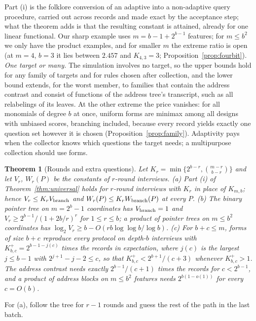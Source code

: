 \documentclass{article}
\newtheorem{theorem}{Theorem}
\begin{document}
Part (i) is the folklore conversion of an adaptive into a non-adaptive query procedure, carried out across records and made exact by the acceptance step; what the theorem adds is that the resulting constant is attained, already for one linear functional. Our sharp example uses $m=b-1+2^{b-1}$ features; for $m\le b^2$ we only have the product examples, and for smaller $m$ the extreme ratio is open (at $m=4$, $b=3$ it lies between $2.457$ and $K_{4,3}=3$; Proposition~\ref{prop:fourbit}). \emph{One target or many.} The simulation involves no target, so the upper bounds hold for any family of targets and for rules chosen after collection, and the lower bound extends, for the worst member, to families that contain the address contrast and consist of functions of the address tree's transcript, such as all relabelings of its leaves. At the other extreme the price vanishes: for all monomials of degree $b$ at once, uniform forms are minimax among all designs with unbiased scores, branching included, because every record yields exactly one question set however it is chosen (Proposition~\ref{prop:family}). Adaptivity pays when the collector knows which questions the target needs; a multipurpose collection should use forms.

\begin{theorem}[Rounds and extra questions]\label{thm:rounds}
Let $K_r=\min\{2^{b-r},\binom{m-r}{b-r}\}$ and let $V_r$, $W_r(P)$ be the constants of $r$-round interviews.
\textup{(a)} Part \textup{(i)} of Theorem~\ref{thm:universal} holds for $r$-round interviews with $K_r$ in place of $K_{m,b}$; hence $V_r\le K_rV_{\rm branch}$ and $W_r(P)\le K_rW_{\rm branch}(P)$ at every $P$.
\textup{(b)} The binary pointer tree on $m=2^b-1$ coordinates has $V_{\rm branch}=1$ and $V_r\ge2^{b-1}/(1+2b/r)^{r}$ for $1\le r\le b$; a product of pointer trees on $m\le b^2$ coordinates has $\log_2V_r\ge b-O(rb\log\log b/\log b)$.
\textup{(c)} For $b+c\le m$, forms of size $b+c$ reproduce every protocol on depth-$b$ interviews with $K^{+}_{b,c}=2^{b-1-j(c)}$ times the records in expectation, where $j(c)$ is the largest $j\le b-1$ with $2^{j+1}-j-2\le c$, so that $K^{+}_{b,c}<2^{b+1}/(c+3)$ whenever $K^{+}_{b,c}>1$. The address contrast needs exactly $2^{b-1}/(c+1)$ times the records for $c<2^{b-1}$, and a product of address blocks on $m\le b^2$ features needs $2^{b(1-o(1))}$ for every $c=O(b)$.
\end{theorem}
For (a), follow the tree for $r-1$ rounds and guess the rest of the path in the last batch.
\end{document}
